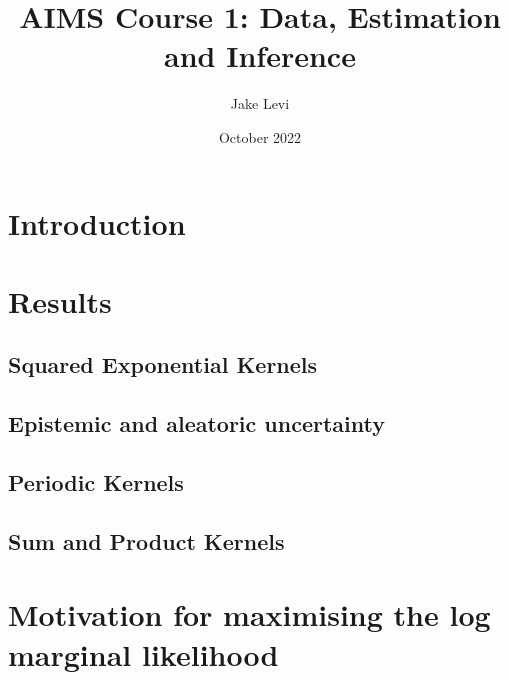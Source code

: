 \documentclass{article}
\title{AIMS Course 1: Data, Estimation and Inference}
\author{Jake Levi}
\date{October 2022}
\begin{document}
\maketitle
\section{Introduction} \label{section:intro}


\section{Results}
\subsection{Squared Exponential Kernels}

\subsection{Epistemic and aleatoric uncertainty}


\subsection{Periodic Kernels}


\subsection{Sum and Product Kernels}








\appendix
\section{Motivation for maximising the log marginal likelihood}\label{appendix:why_lml}
\end{document}
